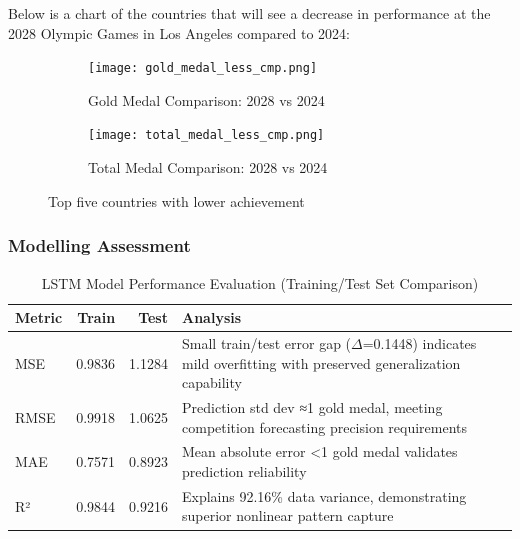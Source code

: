\documentclass{mcmthesis}
\begin{document}
Below is a chart of the countries that will see a decrease in performance at the 2028 Olympic Games in Los Angeles compared to 2024:
\begin{figure}[h!]
	\centering
	\begin{subfigure}[b]{0.45\textwidth}
		\texttt{[image: gold\_medal\_less\_cmp.png]}
		\caption{Gold Medal Comparison: 2028 vs 2024}
		\label{fig:gold_medal1}
	\end{subfigure}
	\hfill
	\begin{subfigure}[b]{0.45\textwidth}
		\texttt{[image: total\_medal\_less\_cmp.png]}
		\caption{Total Medal Comparison: 2028 vs 2024}
		\label{fig:total_medal1}
	\end{subfigure}
	\caption{Top five countries with lower achievement}
	\label{fig:medal_comparison1}
\end{figure}
\subsubsection{Modelling Assessment}

\begin{table}[H]
	\centering
	\caption{LSTM Model Performance Evaluation (Training/Test Set Comparison)}
	\label{tab:model_performance}
	\begin{tabular}{lrrp{8cm}}
		\toprule
		\rowcolor{red!10}
		\textbf{Metric} & \textbf{Train} & \textbf{Test} & \textbf{Analysis} \\
		\midrule
		\rowcolor{gray!10}
		MSE  & 0.9836 & 1.1284 & Small train/test error gap ($\Delta$=0.1448) indicates mild overfitting with preserved generalization capability \\
		RMSE & 0.9918 & 1.0625 & Prediction std dev ≈1 gold medal, meeting competition forecasting precision requirements \\
		\rowcolor{gray!10}
		MAE  & 0.7571 & 0.8923 & Mean absolute error <1 gold medal validates prediction reliability \\
		R²   & 0.9844 & 0.9216 & Explains 92.16\% data variance, demonstrating superior nonlinear pattern capture \\
		\bottomrule
	\end{tabular}
\end{table}
\end{document}

